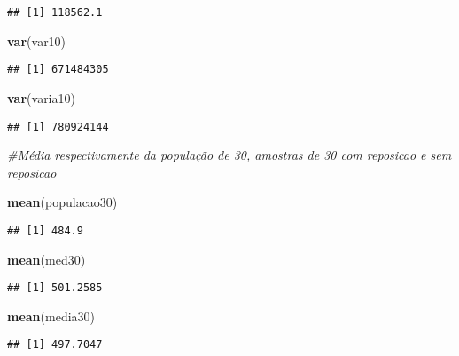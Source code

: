 \documentclass[]{article}
\newenvironment{Shaded}{\begin{snugshade}}{\end{snugshade}}
\newcommand{\KeywordTok}[1]{\textcolor[rgb]{0.13,0.29,0.53}{\textbf{#1}}}
\newcommand{\CommentTok}[1]{\textcolor[rgb]{0.56,0.35,0.01}{\textit{#1}}}
\newcommand{\NormalTok}[1]{#1}
\begin{document}
\begin{verbatim}
## [1] 118562.1
\end{verbatim}

\begin{Shaded}
\begin{Highlighting}[]
\KeywordTok{var}\NormalTok{(var10)}
\end{Highlighting}
\end{Shaded}

\begin{verbatim}
## [1] 671484305
\end{verbatim}

\begin{Shaded}
\begin{Highlighting}[]
\KeywordTok{var}\NormalTok{(varia10)}
\end{Highlighting}
\end{Shaded}

\begin{verbatim}
## [1] 780924144
\end{verbatim}

\begin{Shaded}
\begin{Highlighting}[]
 \CommentTok{#Média respectivamente da população de 30, amostras de 30 com reposicao e sem reposicao}

\KeywordTok{mean}\NormalTok{(populacao30)}
\end{Highlighting}
\end{Shaded}

\begin{verbatim}
## [1] 484.9
\end{verbatim}

\begin{Shaded}
\begin{Highlighting}[]
\KeywordTok{mean}\NormalTok{(med30)}
\end{Highlighting}
\end{Shaded}

\begin{verbatim}
## [1] 501.2585
\end{verbatim}

\begin{Shaded}
\begin{Highlighting}[]
\KeywordTok{mean}\NormalTok{(media30)}
\end{Highlighting}
\end{Shaded}

\begin{verbatim}
## [1] 497.7047
\end{verbatim}
\end{document}
